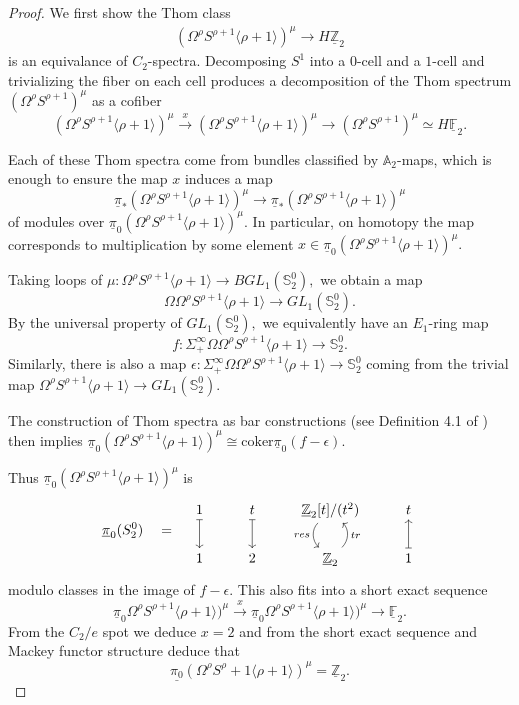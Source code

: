 \documentclass[]{amsart}  %
\theoremstyle{definition}
\numberwithin{equation}{section}
\numberwithin{figure}{section}
\newcommand{\mF}{{\mathbb F}}
\newcommand{\mS}{{\mathbb S}}
\newcommand{\mZ}{{\mathbb Z}}
\newcommand{\umF}{\underline{\mF}}
\newcommand{\umZ}{\underline{\mZ}}
\newcommand{\upi}{\underline{\pi}}
\newcommand{\0}{\langle 0 \rangle}
\begin{document}
\begin{proof}
We first show the Thom class
\begin{align} \label{eq:ThomCl} 
        (\Omega^\rho S^{\rho + 1} \langle \rho + 1 \rangle)^\mu \to H \umZ_2 
\end{align}
 is an equivalance of $C_2$-spectra.   
    Decomposing $S^1$ into a $0$-cell and a $1$-cell and trivializing the fiber on each cell produces a decomposition of the Thom spectrum $(\Omega^\rho S^{\rho + 1})^\mu$ as a cofiber
$$ (\Omega^\rho S^{\rho + 1} \langle \rho + 1 \rangle)^\mu \xrightarrow{x} (\Omega^\rho S^{\rho + 1} \langle \rho + 1 \rangle)^\mu \to (\Omega^\rho S^{\rho + 1})^\mu \simeq H \umF_2. $$

Each of these Thom spectra come from bundles classified by $\mathbb{A}_2$-maps, which is enough to ensure the map $x$ induces a map 
$$\upi_* (\Omega^\rho S^{\rho + 1} \langle \rho + 1 \rangle )^\mu \to \upi_* (\Omega^\rho S^{\rho + 1} \langle \rho + 1 \rangle )^\mu$$ of modules over $\upi_0 (\Omega^\rho S^{\rho + 1} \langle \rho + 1 \rangle )^\mu.$ In particular, on homotopy the map corresponds to multiplication by some element $x \in \upi_0 (\Omega^\rho S^{\rho + 1} \langle \rho + 1 \rangle )^\mu.$

Taking loops of $\mu: \Omega^\rho S^{\rho + 1} \langle \rho + 1 \rangle \to BGL_1 (\mS_2^0),$ we obtain a map
$$ \Omega \Omega^\rho S^{\rho + 1} \langle \rho + 1 \rangle \to GL_1 (\mS_2^0). $$
By the universal property of $GL_1(\mS_2^0),$ we equivalently have an $E_1$-ring map
$$ f: \Sigma_+^{\infty} \Omega \Omega^\rho S^{\rho + 1} \langle \rho + 1 \rangle \to \mS_2^0.$$
Similarly, there is also a map $\epsilon: \Sigma_+^\infty \Omega \Omega^\rho S^{\rho + 1} \langle \rho + 1 \rangle \to \mS^0_2$ coming from the trivial map $\Omega^\rho S^{\rho + 1} \langle \rho + 1 \rangle \to GL_1(\mS_2^0).$

The construction of Thom spectra as bar constructions (see Definition 4.1 of \cite{AndoBlumGepHop2014}) then implies $\underline{\pi}_0 (\Omega^\rho S^{\rho + 1} \langle \rho + 1 \rangle )^\mu \cong \text{coker} \underline{\pi}_0 (f - \epsilon).$ 

Thus  $\underline{\pi}_0 (\Omega^\rho S^{\rho + 1} \langle \rho + 1 \rangle )^\mu$ is 
    \[
\underline{\pi}_0 (S^0_2) \quad = \quad
	\begin{tikzcd} 
            1 \arrow[|->]{d} 
            & t \arrow[|->]{d}
	    &\umZ_2 [t] / (t^2) \arrow[out=225, looseness=1, swap]{d}{res} 
            & t \\
	      1
            & 2
            &\umZ_2 \arrow[in=315, looseness=1, swap]{u}{tr} 
            & 1 \arrow[|->]{u}
	\end{tikzcd}
 \]
    modulo classes in the image of $f - \epsilon.$ This also fits into a short exact sequence
    $$ \underline{\pi}_0 \Omega^\rho S^{\rho + 1} \langle \rho + 1 \rangle)^\mu \xrightarrow{x}  \underline{\pi}_0 \Omega^\rho S^{\rho + 1} \langle \rho + 1 \rangle)^\mu  \to \umF_2. $$
    From the $C_2/e$ spot we deduce $x = 2$ and from the short exact sequence and Mackey functor structure deduce that 
    $$ \underline{\pi_0} (\Omega^\rho S^\rho + 1 \langle \rho + 1 \rangle)^\mu = \umZ_2. $$
    

\end{proof}
\end{document}
